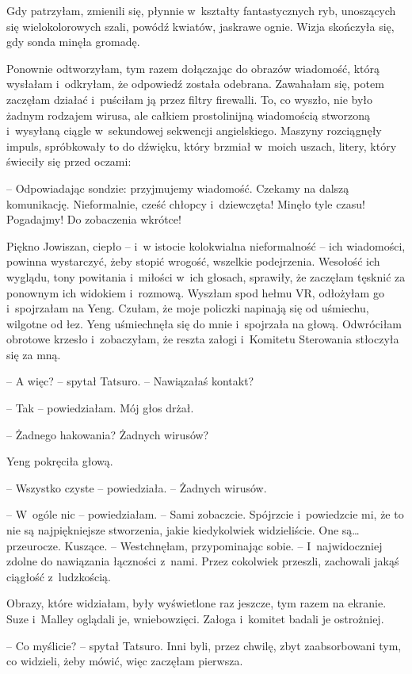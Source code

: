 \documentclass[oneside,polish,11pt,sfheadings]{mwbk}
\begin{document}
Gdy patrzyłam, zmienili się, płynnie w~kształty fantastycznych ryb,
unoszących się wielokolorowych szali, powódź kwiatów, jaskrawe ognie.
Wizja skończyła się, gdy sonda minęła gromadę.

Ponownie odtworzyłam, tym razem dołączając do obrazów wiadomość, którą
wysłałam i~odkryłam, że odpowiedź została odebrana. Zawahałam się, potem
zaczęłam działać i~puściłam ją przez filtry firewalli. To, co wyszło,
nie było żadnym rodzajem wirusa, ale całkiem prostolinijną wiadomością
stworzoną i~wysyłaną ciągle w~sekundowej sekwencji angielskiego. Maszyny
rozciągnęły impuls, spróbkowały to do dźwięku, który brzmiał w~moich
uszach, litery, który świeciły się przed oczami:

-- Odpowiadając sondzie: przyjmujemy wiadomość. Czekamy na dalszą
komunikację. Nieformalnie, cześć chłopcy i~dziewczęta! Minęło tyle
czasu! Pogadajmy! Do zobaczenia wkrótce!

Piękno Jowiszan, ciepło -- i~w istocie kolokwialna nieformalność -- ich
wiadomości, powinna wystarczyć, żeby stopić wrogość, wszelkie
podejrzenia. Wesołość ich wyglądu, tony powitania i~miłości w~ich
głosach, sprawiły, że zaczęłam tęsknić za ponownym ich widokiem i~rozmową. Wyszłam spod hełmu VR, odłożyłam go i~spojrzałam na Yeng.
Czułam, że moje policzki napinają się od uśmiechu, wilgotne od łez. Yeng
uśmiechnęła się do mnie i~spojrzała na głową. Odwróciłam obrotowe
krzesło i~zobaczyłam, że reszta załogi i~Komitetu Sterowania stłoczyła
się za mną.

-- A więc? -- spytał Tatsuro. -- Nawiązałaś kontakt?

-- Tak -- powiedziałam. Mój głos drżał.

-- Żadnego hakowania? Żadnych wirusów?

Yeng pokręciła głową. 

-- Wszystko czyste -- powiedziała. -- Żadnych
wirusów.

-- W~ogóle nic -- powiedziałam. -- Sami zobaczcie. Spójrzcie i~powiedzcie
mi, że to nie są najpiękniejsze stworzenia, jakie kiedykolwiek
widzieliście. One są\ldots  przeurocze. Kuszące. -- Westchnęłam,
przypominając sobie. -- I~najwidoczniej zdolne do nawiązania łączności z~nami. Przez cokolwiek przeszli, zachowali jakąś ciągłość z~ludzkością.

Obrazy, które widziałam, były wyświetlone raz jeszcze, tym razem na
ekranie. Suze i~Malley oglądali je, wniebowzięci. Załoga i~komitet
badali je ostrożniej.

-- Co myślicie? -- spytał Tatsuro. Inni byli, przez chwilę, zbyt
zaabsorbowani tym, co widzieli, żeby mówić, więc zaczęłam pierwsza.
\end{document}
